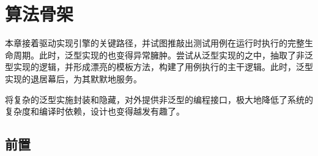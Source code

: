 \begin{savequote}[45mm]
\end{savequote}

\chapter{算法骨架} 
\label{ch:skeleton}

\begin{content}

本章接着驱动实现引擎的关键路径，并试图推敲出测试用例在运行时执行的完整生命周期。此时，泛型实现的也变得异常臃肿。尝试从泛型实现的之中，抽取了非泛型实现的逻辑，并形成漂亮的模板方法，构建了用例执行的主干逻辑。此时，泛型实现的退居幕后，为其默默地服务。

将复杂的泛型实施封装和隐藏，对外提供非泛型的编程接口，极大地降低了系统的复杂度和编译时依赖，设计也变得越发有趣了。

\end{content}

\section{前置}

